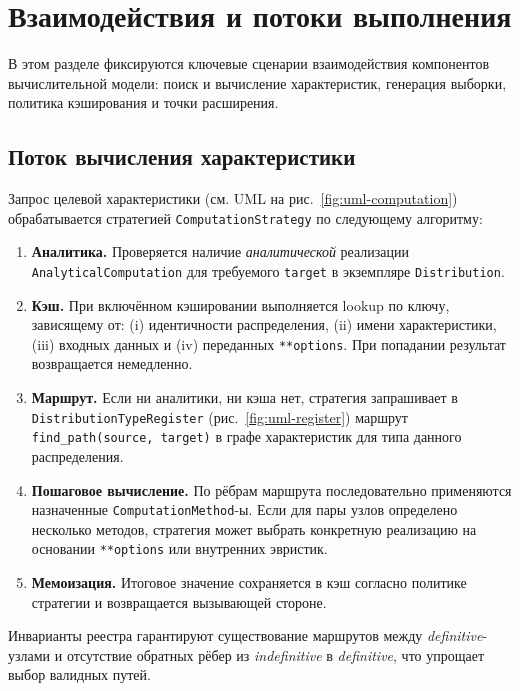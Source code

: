 \section{Взаимодействия и потоки выполнения}
\label{sec:interactions}

В этом разделе фиксируются ключевые сценарии взаимодействия компонентов вычислительной модели:
поиск и вычисление характеристик, генерация выборки, политика кэширования и точки расширения.

\subsection{Поток вычисления характеристики}

Запрос целевой характеристики (см. UML на рис.~\ref{fig:uml-computation}) обрабатывается стратегией
\texttt{ComputationStrategy} по следующему алгоритму:
\begin{enumerate}
  \item \textbf{Аналитика.} Проверяется наличие \emph{аналитической} реализации \texttt{AnalyticalComputation}
        для требуемого \texttt{target} в экземпляре \texttt{Distribution}.
  \item \textbf{Кэш.} При включённом кэшировании выполняется lookup по ключу, зависящему от:
        (i) идентичности распределения, (ii) имени характеристики, (iii) входных данных и
        (iv) переданных \texttt{**options}. При попадании результат возвращается немедленно.
  \item \textbf{Маршрут.} Если ни аналитики, ни кэша нет, стратегия запрашивает в
        \texttt{DistributionTypeRegister} (рис.~\ref{fig:uml-register}) маршрут
        \texttt{find\_path(source, target)} в графе характеристик для типа данного распределения.
  \item \textbf{Пошаговое вычисление.} По рёбрам маршрута последовательно применяются назначенные
        \texttt{ComputationMethod}-ы. Если для пары узлов определено несколько методов, стратегия может
        выбрать конкретную реализацию на основании \texttt{**options} или внутренних эвристик.
  \item \textbf{Мемоизация.} Итоговое значение сохраняется в кэш согласно политике стратегии и возвращается
        вызывающей стороне.
\end{enumerate}

Инварианты реестра гарантируют существование маршрутов между \emph{definitive}-узлами
и отсутствие обратных рёбер из \emph{indefinitive} в \emph{definitive}, что упрощает выбор валидных путей.

